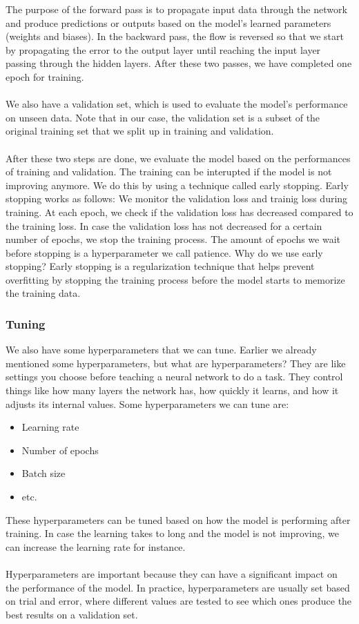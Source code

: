 \documentclass[../paper.tex]{subfiles}
\begin{document}
    The purpose of the forward pass is to propagate input data through the network and produce predictions or outputs based on the model's learned parameters (weights and biases).\cite{o13}
    In the backward pass, the flow is reversed so that we start by propagating the error to the output layer until reaching the input layer passing through the hidden layers.\cite{o14}
    After these two passes, we have completed one epoch for training.
    \\\\
    We also have a validation set, which is used to evaluate the model's performance on unseen data.
    Note that in our case, the validation set is a subset of the original training set that we split up in training and validation.
    \\\\
    After these two steps are done, we evaluate the model based on the performances of training and validation.
    The training can be interupted if the model is not improving anymore.
    We do this by using a technique called early stopping.
    Early stopping works as follows:
    We monitor the validation loss and trainig loss during training. 
    At each epoch, we check if the validation loss has decreased compared to the training loss.
    In case the validation loss has not decreased for a certain number of epochs, we stop the training process.
    The amount of epochs we wait before stopping is a hyperparameter we call patience.
    Why do we use early stopping?
    Early stopping is a regularization technique that helps prevent overfitting by stopping the training process before the model starts to memorize the training data.\cite{o15}
    \subsubsection{Tuning}
    We also have some hyperparameters that we can tune.
    Earlier we already mentioned some hyperparameters, but what are hyperparameters?
    They are like settings you choose before teaching a neural network to do a task. 
    They control things like how many layers the network has, how quickly it learns, and how it adjusts its internal values.\cite{o16}
    Some hyperparameters we can tune are:
    \begin{itemize}
        \item Learning rate
        \item Number of epochs
        \item Batch size
        \item etc.
    \end{itemize}
    These hyperparameters can be tuned based on how the model is performing after training.
    In case the learning takes to long and the model is not improving, we can increase the learning rate for instance.
    \\\\ 
    Hyperparameters are important because they can have a significant impact on the performance of the model.
    In practice, hyperparameters are usually set based on trial and error, 
    where different values are tested to see which ones produce the best results on a validation set.
\end{document}

